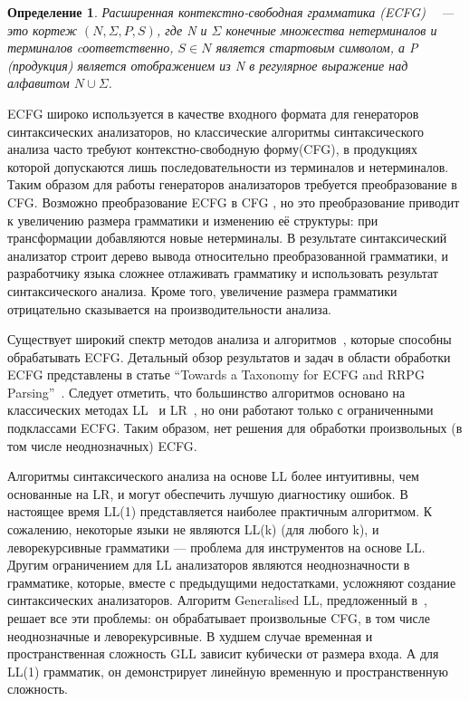 \documentclass[14pt]{matmex-diploma-custom}
\newtheorem{mydef}{Определение}
\begin{document}
	\begin{mydef}
		Расширенная контекстно-свободная грамматика \newline(ECFG) ~\cite{ECFG} --- это кортеж $(N, \Sigma, P, S)$,
		где N и $\Sigma$ конечные множества нетерминалов и терминалов cоответственно, 
		$S\in N$ является стартовым символом, а P (продукция) является отображением из N в
		регулярное выражение над алфавитом $N \cup \Sigma$.
		
	\end{mydef}
	ECFG широко используется в качестве входного формата для генераторов синтаксических анализаторов, 
	но классические алгоритмы синтаксического анализа часто требуют контекстно-свободную форму(CFG),
	в продукциях которой допускаются лишь последовательности из терминалов и нетерминалов. Таким образом 
	для работы генераторов анализаторов требуется преобразование в CFG.
	Возможно преобразование ECFG в CFG \cite{ELL}, но это преобразование приводит к увеличению
	размера грамматики и изменению её структуры: при трансформации добавляются новые
	нетерминалы. В результате синтаксический анализатор строит дерево вывода относительно
	преобразованной грамматики, и разработчику языка сложнее отлаживать грамматику 
	и использовать результат синтаксического анализа. Кроме того, увеличение размера грамматики 
    отрицательно сказывается на производительности анализа.
    
	Существует широкий спектр методов анализа и алгоритмов~\cite{AttributedELL,ELRR,
		ECFGparsing,ELLParser,ELL,ECFG,ELALR,ELRParsing}, которые способны обрабатывать 
	ECFG. Детальный обзор результатов и задач в области обработки ECFG 
	представлены в статье ``Towards a Taxonomy for ECFG and RRPG Parsing''~\cite{ECFG}.
	Следует отметить, что большинство алгоритмов основано на классических методах
	LL~\cite{ELLParser,AttributedELL,PredictiveECFG} и LR~\cite{ELRParsing,ELALR,ELRR},
	но они работают только с ограниченными подклассами ECFG. Таким образом, нет решения 
	для обработки произвольных (в том числе неоднозначных) ECFG.
	
	Алгоритмы синтаксического анализа на основе LL более интуитивны, чем основанные на LR, и могут
	обеспечить лучшую диагностику ошибок. В настоящее время LL(1) представляется
	наиболее практичным алгоритмом. К сожалению, некоторые языки не являются LL(k) (для любого k),
	и леворекурсивные грамматики --- проблема для инструментов на основе LL. 
	Другим ограничением для LL анализаторов являются неоднозначности в грамматике, 
	которые, вместе с предыдущими недостатками, усложняют создание синтаксических 
	анализаторов. Алгоритм Generalised LL, предложенный в~\cite{scott2010gll}, решает 
	все эти проблемы: он обрабатывает произвольные CFG, в том числе неоднозначные и
	леворекурсивные.
	В худшем случае временная и пространственная сложность GLL зависит кубически от 
	размера входа. А для LL(1) грамматик, он демонстрирует линейную временную и
	пространственную сложность.
    
\end{document}
